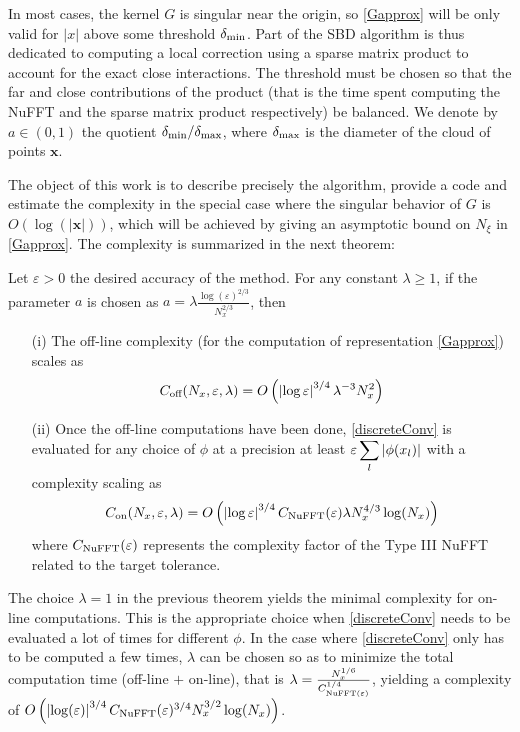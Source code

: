 \documentclass[11pt,a4paper]{article}
\begin{document}
In most cases, the kernel $G$ is singular near the origin, so \eqref{Gapprox} will be only valid for $|x|$ above some threshold $\delta_{\min}$. Part of the SBD algorithm is thus dedicated to computing a local correction using a sparse matrix product to account for the exact close interactions. The threshold must be chosen so that the far and close contributions of the product (that is the time spent computing the NuFFT and the sparse matrix product respectively) be balanced. We denote by $a \in (0,1)$ the quotient ${\delta_{\min}}/{\delta_{\max}}$, where $\delta_{\max}$ is the diameter of the cloud of points $\boldsymbol{x}$.

The object of this work is to describe precisely the algorithm, provide a  code and estimate the complexity in the special case where the singular behavior of $G$ is $O(\log(|\boldsymbol{x}|))$, which will be achieved by giving an asymptotic bound on $N_\xi$ in \eqref{Gapprox}. The complexity is summarized in the next theorem:

\begin{The} Let $\varepsilon > 0$ the desired accuracy of the method. For any constant $\lambda \geq 1$, if the parameter $a$ is chosen as $a = \lambda\frac{\log(\varepsilon)^{2/3}}{N_x^{2/3}}$, then
	\label{GlobalComplexity}
	\begin{itemize}
		\item[(i)]  The off-line complexity (for the computation of representation \eqref{Gapprox}) scales as
		      \[ C_{\textup{off}}(N_x,\varepsilon,\lambda) = O\left(\left\lvert \log \varepsilon \right\rvert^{3/4} \lambda^{-3} N_x^2\right)\]
		\item[(ii)] Once the off-line computations have been done, \eqref{discreteConv} is evaluated for any choice of $\phi$ at a precision at least $\varepsilon \displaystyle\sum_l {\left\lvert \phi(x_l) \right\rvert}$ with a complexity scaling as
		      \[C_{\textup{on}}(N_x,\varepsilon,\lambda) = O\left( \left\lvert \log\varepsilon \right\rvert^{3/4} C_{\textup{NuFFT}}(\varepsilon) \lambda N_x ^{4/3} \log(N_x)\right)\] 
		      where $C_{\textup{NuFFT}}(\varepsilon)$ represents the complexity factor of the Type III \textup{NuFFT} related to the target tolerance. 
	\end{itemize} 
\end{The}

The choice $\lambda = 1$ in the previous theorem yields the minimal complexity for on-line computations. This is the appropriate choice when \eqref{discreteConv} needs to be evaluated a lot of times for different $\phi$. In the case where \eqref{discreteConv} only has to be computed a few times, $\lambda$ can be chosen so as to minimize the total computation time (off-line $+$ on-line), that is $\lambda = \frac{N_x^{1/6}}{C_{\textup{NuFFT}(\varepsilon)}^{1/4}}$, yielding a complexity of $O\left( \left\lvert \log(\varepsilon) \right\rvert^{3/4}C_{\textup{NuFFT}}(\varepsilon)^{3/4}N_x^{3/2}\log(N_x)\right)$. 


		
\end{document}
